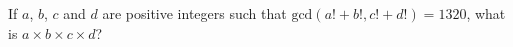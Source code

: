 If $a$, $b$, $c$ and $d$ are positive integers such that $\mathrm{gcd}(a!+b!,c!+d!)=1320$, what is $a\times b\times c\times d$?
